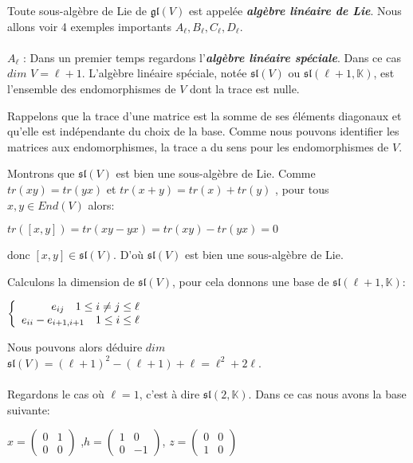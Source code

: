 \documentclass[a4paper,openany,12pt]{report}
\newcommand{\KK}{\mathbb{K}}
\newcommand{\gl}{\mathfrak{gl}}
\newcommand{\ssl}{\mathfrak{sl}}
\theoremstyle{break}
{\theorembodyfont{\upshape}
\newtheorem*{rmq}{Remarque :}
\newtheorem*{prv}{Preuve :}
\newtheorem*{ex}{Exemples :}
\newtheorem*{exe}{Exemple : }
\newtheorem*{nota}{Notation :}
\newtheorem*{dem}{D\'emonstration :}}
\begin{document}
Toute sous-algèbre de Lie de $\gl(V)$ est appelée \emph{\textbf{algèbre linéaire de Lie}}. Nous allons voir 4 exemples importants  $A_{\ell}, B_{\ell}, C_{\ell}, D_{\ell}$.\\
\\
$ A_{\ell} $ : Dans un premier temps regardons l'\emph{\textbf{algèbre linéaire spéciale}}. Dans ce cas $dim$ $V= \ell +1$. L'algèbre linéaire spéciale, notée $\ssl(V)$ ou $\ssl(\ell+1,\KK)$, est l'ensemble des endomorphismes de $V$ dont la trace est nulle.

Rappelons que la trace d'une matrice est la somme de ses éléments diagonaux et qu'elle est indépendante du choix de la base. Comme nous pouvons identifier les matrices aux endomorphismes, la trace a du sens pour les endomorphismes de $V$.

Montrons que $\ssl(V)$ est bien une sous-algèbre de Lie. Comme $tr(xy)=tr(yx)$ et $tr(x+y)= tr(x) + tr(y)$ ,  pour tous $x,y  \in End(V)$ alors:
\begin{center}
$tr([x,y])=tr(xy-yx)=tr(xy)-tr(yx)=0$
\end{center} 
donc $[x,y] \in \ssl(V)$. D'où $\ssl(V)$ est bien une sous-algèbre de Lie.

Calculons la dimension de $\ssl(V)$, pour cela donnons une base de $\ssl(\ell+1,\KK)$:
\begin{center}
$\left \{
   \begin{array}{r c l}
e_{ij }\quad 1\leq i \neq j \leq \ell \\
e_{ii}-e_{i+1,i+1} \quad 1\leq i \leq \ell
   \end{array}
   \right .$
\end{center}

Nous pouvons alors déduire $dim$ $\ssl(V) = (\ell + 1)^2 - (\ell + 1) + \ell = \ell^2+2\ell$.\\
\\
Regardons le cas où $\ell=1$, c'est à dire $\ssl(2,\KK)$. Dans ce cas nous avons la base suivante:
\begin{center}
$ x=\begin{pmatrix} 0 & 1 \\ 0 & 0 \end{pmatrix} $ ,\quad $ h=\begin{pmatrix} 1 & 0 \\ 0 & -1 \end{pmatrix} $, \quad $ z=\begin{pmatrix} 0 & 0 \\ 1 & 0 \end{pmatrix} $
\end{center}
\end{document}

